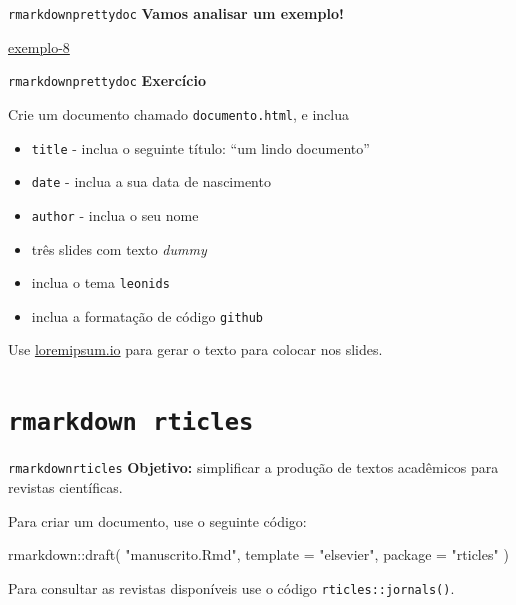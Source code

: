 \documentclass[
  10pt,
  ignorenonframetext,
]{beamer}
\newenvironment{Shaded}{\begin{snugshade}}{\end{snugshade}}
\newcommand{\AttributeTok}[1]{\textcolor[rgb]{0.40,0.45,0.13}{#1}}
\newcommand{\FunctionTok}[1]{\textcolor[rgb]{0.28,0.35,0.67}{#1}}
\newcommand{\NormalTok}[1]{\textcolor[rgb]{0.00,0.23,0.31}{#1}}
\newcommand{\SpecialCharTok}[1]{\textcolor[rgb]{0.37,0.37,0.37}{#1}}
\newcommand{\StringTok}[1]{\textcolor[rgb]{0.13,0.47,0.30}{#1}}
\providecommand{\tightlist}{%
  \setlength{\itemsep}{0pt}\setlength{\parskip}{0pt}}\usepackage{longtable,booktabs,array}
\begin{document}
\begin{frame}{\texttt{rmarkdown}\newline \texttt{prettydoc}}
\protect\hypertarget{rmarkdownprettydoc-2}{}
\textbf{Vamos analisar um exemplo!}

\href{https://ufbabr-my.sharepoint.com/:u:/g/personal/gilberto_sassi_ufba_br/EcN43jJaJOlAqKvt3DTBJlkBMMFpx23iX3Wyiwv3Uawt_g?e=LWLTgh}{exemplo-8}
\end{frame}

\begin{frame}[fragile]{\texttt{rmarkdown}\newline \texttt{prettydoc}}
\protect\hypertarget{rmarkdownprettydoc-3}{}
\textbf{Exercício}

Crie um documento chamado \texttt{documento.html}, e inclua

\begin{itemize}
\tightlist
\item
  \texttt{title} - inclua o seguinte título: ``um lindo documento''
\item
  \texttt{date} - inclua a sua data de nascimento
\item
  \texttt{author} - inclua o seu nome
\item
  três slides com texto \emph{dummy}
\item
  inclua o tema \texttt{leonids}
\item
  inclua a formatação de código \texttt{github}
\end{itemize}

Use \href{https://loremipsum.io/}{loremipsum.io} para gerar o texto para
colocar nos slides.
\end{frame}

\hypertarget{rmarkdown-rticles}{%
\section{\texorpdfstring{\texttt{rmarkdown}\newline\newline~\texttt{rticles}}{rmarkdown~rticles}}\label{rmarkdown-rticles}}

\begin{frame}[fragile]{\texttt{rmarkdown}\newline \texttt{rticles}}
\protect\hypertarget{rmarkdownrticles}{}
\textbf{Objetivo:} simplificar a produção de textos acadêmicos para
revistas científicas.

Para criar um documento, use o seguinte código:

\begin{Shaded}
\begin{Highlighting}[]
\NormalTok{rmarkdown}\SpecialCharTok{::}\FunctionTok{draft}\NormalTok{(}
  \StringTok{"manuscrito.Rmd"}\NormalTok{,}
  \AttributeTok{template =} \StringTok{"elsevier"}\NormalTok{,}
  \AttributeTok{package =} \StringTok{"rticles"}
\NormalTok{)}
\end{Highlighting}
\end{Shaded}

Para consultar as revistas disponíveis use o código
\texttt{rticles::jornals()}.
\end{frame}
\end{document}
